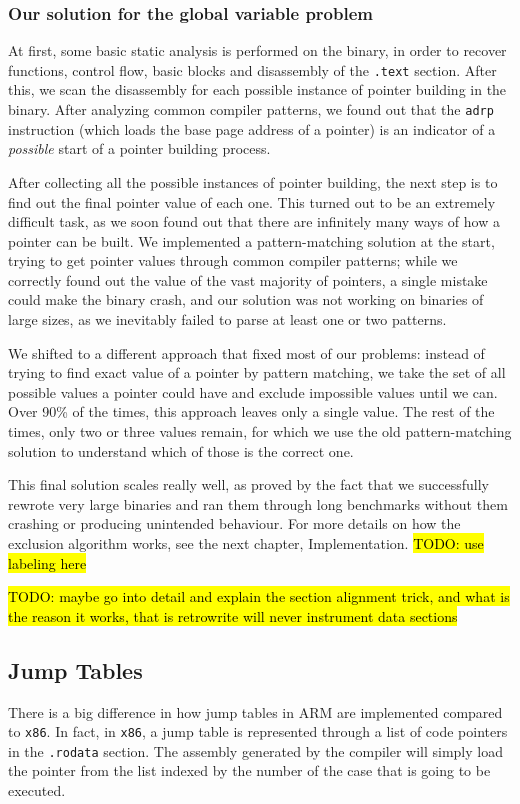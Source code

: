 \documentclass[a4paper,11pt,oneside]{report}
\newcommand{\todo}[1]{%
	\begingroup 
	\sethlcolor{cyan}%
	\hl{TODO: #1}%
	\endgroup
}
\begin{document}
\subsubsection{Our solution for the global variable problem}

At first, some basic static analysis is performed on the binary, in order to 
recover functions, control flow, basic blocks and disassembly of the 
\texttt{.text} section. After this, we scan the disassembly for each possible 
instance of pointer building in the binary. After analyzing common compiler 
patterns, we found out that the \texttt{adrp} instruction (which loads the base 
page address of a pointer) is an indicator of a \emph{possible} start of a 
pointer building process. 

After collecting all the possible instances of pointer building, the next step 
is to find out the final pointer value of each one. This turned out to be an 
extremely difficult task, as we soon found out that there are infinitely many 
ways of how a pointer can be built. We implemented a pattern-matching solution 
at the start, trying to get pointer values through common compiler patterns; 
while we correctly found out the value of the vast majority of pointers, a 
single mistake could make the binary crash, and our solution was not working on 
binaries of large sizes, as we inevitably failed to parse at least one or two 
patterns.

We shifted to a different approach that fixed most of our problems: instead of 
trying to find exact value of a pointer by pattern matching, we take the set of 
all possible values a pointer could have and exclude impossible values until we 
can. Over 90\% of the times, this approach leaves only a single value. The rest 
of the times, only two or three values remain, for which we use the old 
pattern-matching solution to understand which of those is the correct one. 

This final solution scales really well, as proved by the fact that we 
successfully rewrote very large binaries and ran them through long benchmarks 
without them crashing or producing unintended behaviour. For more details on 
how the exclusion algorithm works, see the next chapter, Implementation.  
\todo{use labeling here}
\todo{ maybe go into detail and explain the section alignment trick, and what 
is the reason it works, that is retrowrite will never instrument data sections}


\subsection{Jump Tables}
There is a big difference in how jump tables in ARM are implemented compared to 
\texttt{x86}. In fact, in \texttt{x86}, a jump table is represented through a 
list of code pointers in the \texttt{.rodata} section. The assembly generated 
by the compiler will simply load the pointer from the list indexed by the 
number of the case that is going to be executed. 
\end{document}
